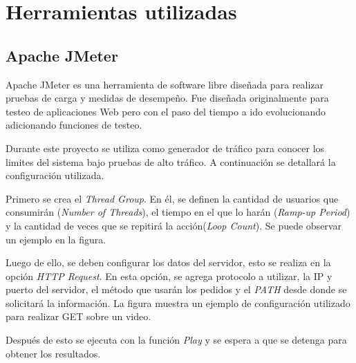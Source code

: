 \documentclass[12pt,a4paper,oneside]{book}
\begin{document}
\chapter{Herramientas utilizadas}

\section{Apache JMeter}
\label{AnexoJMeter}

Apache JMeter es una herramienta de software libre diseñada para realizar pruebas de carga y medidas de desempeño. Fue diseñada originalmente para testeo de aplicaciones Web pero con el paso del tiempo a ido evolucionando adicionando funciones de testeo.

\vspace{0.5cm}

Durante este proyecto se utiliza como generador de tráfico para conocer los limites del sistema bajo pruebas de alto tráfico. A continuación se detallará la configuración utilizada.

\vspace{0.5cm}

Primero se crea el \textit{Thread Group}. En él, se definen la cantidad de usuarios que consumirán (\textit{Number of Threads}), el tiempo en el que lo harán (\textit{Ramp-up Period}) y la cantidad de veces que se repitirá la acción(\textit{Loop Count}). Se puede observar un ejemplo en la figura.

\vspace{0.5cm}


\vspace{0.5cm}

Luego de ello, se deben configurar los datos del servidor, esto se realiza en la opción \textit{HTTP Request}. En esta opción, se agrega protocolo a utilizar, la IP y puerto del servidor, el método que usarán los pedidos y el \textit{PATH} desde donde se solicitará la información. La figura  muestra un ejemplo de configuración utilizado para realizar GET sobre un video.

\vspace{0.5cm}

Después de esto se ejecuta con la función \textit{Play} y se espera a que se detenga para obtener los resultados.
\end{document}
